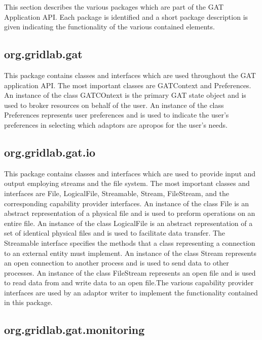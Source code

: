 \documentclass[$Date: 2003/06/26 19:29:31 $]{glabarticle}
\begin{document}
This section describes the various packages which are part of the GAT Application API. Each package is
identified and a short package description is given indicating the functionality of the various contained
elements. 

\subsection{org.gridlab.gat}

This package contains classes and interfaces which are used throughout the GAT application API. The
most important classes are GATContext and Preferences. An instance of the class GATCOntext is the
primary GAT state object and is used to broker resources on behalf of the user. An instance of the class
Preferences represents user preferences and is used to indicate the user's preferences in selecting
which adaptors are apropos for the user's needs. 

\subsection{org.gridlab.gat.io}

This package contains classes and interfaces which are used to provide input and output employing 
streams and the file system. The most important classes and interfaces are File, LogicalFile, Streamable,
Stream, FileStream, and the corresponding capability provider interfaces. An instance of the class File
is an abstract representation of a physical file and is used to preform operations on an entire file.
An instance of the class LogicalFile is an abstract representation of a set of identical physical files
and is used to facilitate data transfer. The Streamable interface specifies the methods that a class
representing a connection to an external entity must implement. An instance of the class Stream
represents an open connection to another process and is used to send data to other processes.
An instance of the class FileStream represents an open file and is used to read data from and write
data to an open file.The various capability provider interfaces are used by an adaptor writer to 
implement the functionality contained in this package. 

\subsection{org.gridlab.gat.monitoring}
\end{document}
